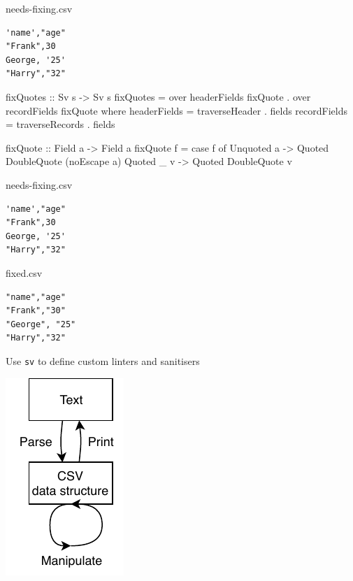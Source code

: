\documentclass[UKenglish,usenames,dvipsnames,svgnames,table,aspectratio=169,mathserif]{beamer}
\newcommand{\nl}{\vspace{\baselineskip}}
\begin{document}
\begin{frame}[fragile]
\begin{block}{needs-fixing.csv}
\begin{Verbatim}
'name',"age"
"Frank",30
George, '25'
"Harry","32"
\end{Verbatim}
\end{block}
\end{frame}


\begin{frame}[fragile]
\begin{haskellcode}
fixQuotes :: Sv s -> Sv s
fixQuotes =
  over headerFields fixQuote . over recordFields fixQuote
    where
      headerFields = traverseHeader . fields
      recordFields = traverseRecords . fields

      fixQuote :: Field a -> Field a
      fixQuote f = case f of
        Unquoted a -> Quoted DoubleQuote (noEscape a)
        Quoted _ v -> Quoted DoubleQuote v
\end{haskellcode}
\end{frame}


\begin{frame}[fragile]
\begin{block}{needs-fixing.csv}
\begin{Verbatim}
'name',"age"
"Frank",30
George, '25'
"Harry","32"
\end{Verbatim}
\end{block}
\end{frame}


\begin{frame}[fragile]
\begin{block}{fixed.csv}
\begin{Verbatim}
"name","age"
"Frank","30"
"George", "25"
"Harry","32"
\end{Verbatim}
\end{block}
\end{frame}


\begin{frame}
\Large \centering
Use {\tt sv} to define custom linters and sanitisers

\nl
\includegraphics[scale=1]{pipeline-parse-print.pdf}

\end{frame}
\end{document}
